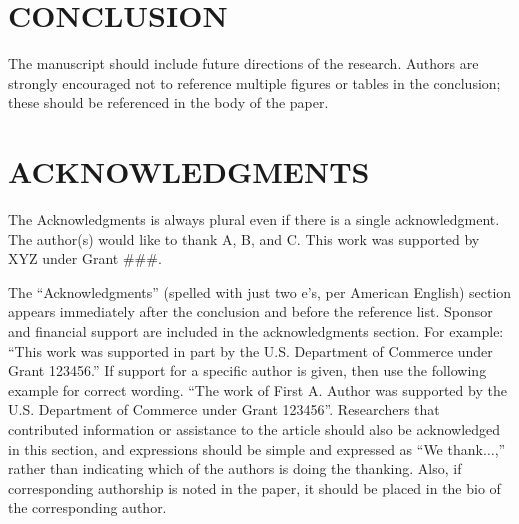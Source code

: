 \documentclass{IEEEcsmag}
\begin{document}
\section{CONCLUSION}
The manuscript should include future directions of the research. Authors are strongly encouraged not to reference multiple figures or tables in the conclusion; these should be referenced in the body of the paper.\vspace*{-8pt}


\section{ACKNOWLEDGMENTS}
The Acknowledgments is always plural even if there is a single acknowledgment. The author(s) would like to thank A, B, and C. This work was supported by XYZ under Grant \#\#\#.


The ``Acknowledgments'' (spelled with just two e's, per American English) section appears immediately after the conclusion and before the reference list. Sponsor and financial support  are included in the acknowledgments section. For example: ``This work was supported in part by the U.S. Department of Commerce under Grant 123456.'' If support for a specific author is given, then use the following example for correct  wording. ``The work of First A. Author was supported by the U.S. Department of Commerce under Grant 123456''. Researchers that contributed information or assistance to the article should also be acknowledged in this section, and expressions should be simple and expressed as ``We thank$\ldots$,'' rather than indicating which of the authors is doing the thanking. Also, if corresponding authorship is noted in the paper, it should be placed in the bio of the corresponding author.


\def\refname{REFERENCES}
\end{document}
